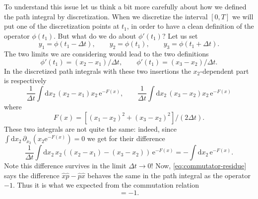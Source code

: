 \documentclass[12pt,letterpaper,reqno]{article}
\numberwithin{equation}{section}
\newcommand{\e}{{\mathrm e}}
\newcommand{\de}{\mathrm{d}}
\begin{document}
To understand this issue let us think a bit more carefully
about how we defined the path integral by discretization.
When we discretize the interval $[0,T]$ we will put one
of the discretization points at $t_1$, in order to have
a clean definition of the operator $\phi(t_1)$.
But what do we do about $\phi'(t_1)$?
Let us set
\begin{equation}
  y_1 = \phi(t_1 - \Delta t), \qquad y_2 = \phi(t_1), \qquad y_3 = \phi(t_1 + \Delta t).
\end{equation}
The two limits we are considering would lead to the two definitions
\begin{equation}
  \phi'(t_1) = (x_2 - x_1) / \Delta t, \qquad \phi'(t_1) = (x_3 - x_2) / \Delta t.
\end{equation}
In the discretized path integrals with these two 
insertions the $x_2$-dependent part is respectively
\begin{equation}
  \frac{1}{\Delta t} \int \de x_2 \, (x_2 - x_1) x_2 \, \e^{-F(x)}, \qquad
  \frac{1}{\Delta t} \int \de x_2 \, (x_3 - x_2) x_2 \, \e^{-F(x)}
\end{equation}
where
\begin{equation}
  F(x) = [(x_1 - x_2)^2 + (x_3 - x_2)^2] / (2 \Delta t).
\end{equation}
These two integrals are not quite the same: indeed, since $\int \de x_2 \, \partial_{x_2} (x_2 \e^{-F(x)}) = 0$ we get for their difference
\begin{equation} \label{eq:commutator-residue}
  \frac{1}{\Delta t} \int \de x_2 \, x_2 ((x_2 - x_1) - (x_3 - x_2))  \, \e^{-F(x)}
=  -\int \de x_2 \, \e^{-F(x)}.
\end{equation}
Note this difference survives in the limit 
$\Delta t \to 0$!
Now, \eqref{eq:commutator-residue} says the difference $\hat x \hat p - \hat p \hat x$
behaves the same in the path integral as the operator $-1$.
Thus it is what we expected from the commutation relation
\begin{equation}
  [\hat p, \hat x] = -1.
\end{equation}
\end{document}
